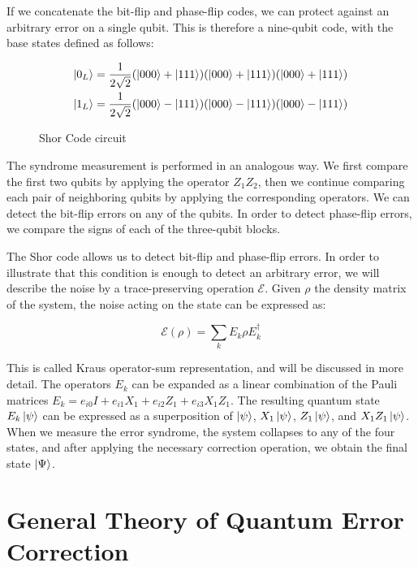 \documentclass[12pt, twoside, openany]{book}
\begin{document}
If we concatenate the bit-flip and phase-flip codes, we can protect against an arbitrary error on a single qubit. This is therefore a nine-qubit code, with the base states defined as follows:

\begin{align*}
    \ket{0_L} = \frac{1}{2 \sqrt{2}} (\ket{000} + \ket{111}) (\ket{000} + \ket{111}) (\ket{000} + \ket{111}) \\
    \ket{1_L} = \frac{1}{2 \sqrt{2}} (\ket{000} - \ket{111}) (\ket{000} - \ket{111}) (\ket{000} - \ket{111})
\end{align*}

\begin{figure}[h]
\centering

\caption{Shor Code circuit}
\end{figure}

The syndrome measurement is performed in an analogous way. We first compare the first two qubits by applying the operator $Z_1 Z_2$, then we continue comparing each pair of neighboring qubits by applying the corresponding operators. We can detect the bit-flip errors on any of the qubits. In order to detect phase-flip errors, we compare the signs of each of the three-qubit blocks. 

The Shor code allows us to detect bit-flip and phase-flip errors. In order to illustrate that this condition is enough to detect an arbitrary error, we will describe the noise by a trace-preserving operation $\mathcal{E}$. Given $\rho$ the density matrix of the system, the noise acting on the state can be expressed as:

\begin{equation} \label{Kraus}
    \mathcal{E}(\rho) = \sum_k E_k \rho E_k^\dagger
\end{equation}

This is called Kraus operator-sum representation, and will be discussed in more detail. The operators $E_k$ can be expanded as a linear combination of the Pauli matrices $E_k = e_{i0} I + e_{i1} X_1 + e_{i2} Z_1 + e_{i3} X_1 Z_1$. The resulting quantum state $E_k \ket{ \psi }$ can be expressed as a superposition of $\ket{\psi}$, $X_1 \ket{\psi}$, $Z_1 \ket{\psi}$, and $X_1 Z_1 \ket{\psi}$. When we measure the error syndrome, the system collapses to any of the four states, and after applying the necessary correction operation, we obtain the final state $\ket{\Psi}$. 

\section{General Theory of Quantum Error Correction}
\end{document}
